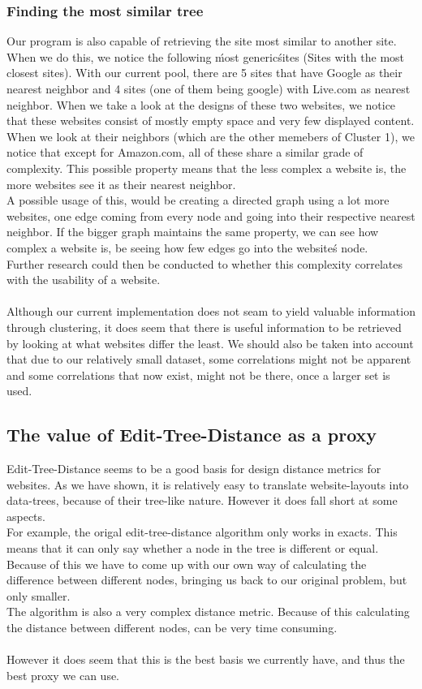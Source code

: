 \subsubsection*{Finding the most similar tree}
Our program is also capable of retrieving the site most similar to another site. When we do this, we notice the following \'most generic\' sites (Sites with the most closest sites). With our current pool, there are 5 sites that have Google as their nearest neighbor and 4 sites (one of them being google) with Live.com as nearest neighbor. When we take a look at the designs of these two websites, we notice that these websites consist of mostly empty space and very few displayed content.
\\When we look at their neighbors (which are the other memebers of Cluster 1), we notice that except for Amazon.com, all of these share a similar grade of complexity. This possible property means that the less complex a website is, the more websites see it as their nearest neighbor.
\\ A possible usage of this, would be creating a directed graph using a lot more websites, one edge coming from every node and going into their respective nearest neighbor. If the bigger graph maintains the same property, we can see how complex a website is, be seeing how few edges go into the website\'s node.
\\ Further research could then be conducted to whether this complexity correlates with the usability of a website.
\\\\
Although our current implementation does not seam to yield valuable information through clustering, it does seem that there is useful information to be retrieved by looking at what websites differ the least. We should also be taken into account that due to our relatively small dataset, some correlations might not be apparent and some correlations that now exist, might not be there, once a larger set is used.

\subsection{The value of Edit-Tree-Distance as a proxy}
Edit-Tree-Distance seems to be a good basis for design distance metrics for websites. As we have shown, it is relatively easy to translate website-layouts into data-trees, because of their tree-like nature. However it does fall short at some aspects.
\\For example, the origal edit-tree-distance algorithm only works in exacts. This means that it can only say whether a node in the tree is different or equal. Because of this we have to come up with our own way of calculating the difference between different nodes, bringing us back to our original problem, but only smaller.
\\The algorithm is also a very complex distance metric. Because of this calculating the distance between different nodes, can be very time consuming.
\\\\However it does seem that this is the best basis we currently have, and thus the best proxy we can use.

